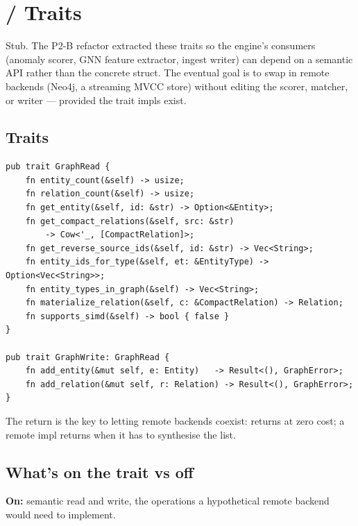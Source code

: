 \chapter{ /  Traits}
\label{ch:graph-traits}

\begin{note}
Stub. The P2-B refactor extracted these traits so the engine's
consumers (anomaly scorer, GNN feature extractor, ingest writer)
can depend on a semantic API rather than the concrete
 struct. The eventual goal is to swap in remote
backends (Neo4j, a streaming MVCC store) without editing the
scorer, matcher, or writer --- provided the trait impls exist.
\end{note}

\section{Traits}

\begin{lstlisting}[style=rust]
pub trait GraphRead {
    fn entity_count(&self) -> usize;
    fn relation_count(&self) -> usize;
    fn get_entity(&self, id: &str) -> Option<&Entity>;
    fn get_compact_relations(&self, src: &str)
        -> Cow<'_, [CompactRelation]>;
    fn get_reverse_source_ids(&self, id: &str) -> Vec<String>;
    fn entity_ids_for_type(&self, et: &EntityType) -> Option<Vec<String>>;
    fn entity_types_in_graph(&self) -> Vec<String>;
    fn materialize_relation(&self, c: &CompactRelation) -> Relation;
    fn supports_simd(&self) -> bool { false }
}

pub trait GraphWrite: GraphRead {
    fn add_entity(&mut self, e: Entity)   -> Result<(), GraphError>;
    fn add_relation(&mut self, r: Relation) -> Result<(), GraphError>;
}
\end{lstlisting}

The  return is the key to letting
remote backends coexist:  returns
 at zero cost; a remote impl returns
 when it has to synthesise the list.

\section{What's on the trait vs off}

\textbf{On:} semantic read and write, the operations a hypothetical
remote backend would need to implement.

